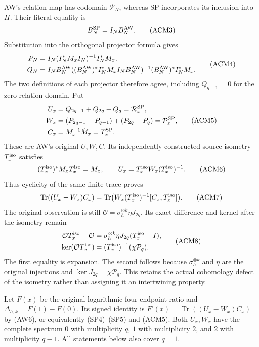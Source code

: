 AW's relation map has codomain $\mathcal P_N$, whereas SP incorporates
its inclusion into $H$. Their literal equality is
\[
 B_N^{\rm SP}=I_NB_N^{\rm AW}.
 \tag{ACM3}
\]
Substitution into the orthogonal projector formula gives
\[
 \begin{aligned}
 P_N&=I_N(I_N^*M_xI_N)^{-1}I_N^*M_x,\\
 Q_N&=I_NB_N^{\rm AW}
       ((B_N^{\rm AW})^*I_N^*M_xI_NB_N^{\rm AW})^{-1}
       (B_N^{\rm AW})^*I_N^*M_x.
 \end{aligned}
 \tag{ACM4}
\]
The two definitions of each projector therefore agree, including
$Q_{q-1}=0$ for the zero relation domain. Put
\[
 \begin{aligned}
 U_x&=Q_{2q-1}+Q_{2q}-Q_q=\mathcal R_x^{\rm SP},\\
 W_x&=(P_{2q-1}-P_{q-1})+(P_{2q}-P_q)=\mathcal P_x^{\rm SP},\\
 C_x&=M_x^{-1}\dot M_x=T_x^{\rm SP}.
 \end{aligned}
 \tag{ACM5}
\]
These are AW's original $U,W,C$. Its independently constructed
source isometry $T^{\rm iso}_x$ satisfies
\[
 (T^{\rm iso}_x)^*M_xT^{\rm iso}_x=M_x,\qquad
 U_x=T^{\rm iso}_xW_x(T^{\rm iso}_x)^{-1}.
 \tag{ACM6}
\]
Thus cyclicity of the same finite trace proves
\[
 \operatorname{Tr}((U_x-W_x)C_x)
 =\operatorname{Tr}\bigl(W_x(T^{\rm iso}_x)^{-1}
                             [C_x,T^{\rm iso}_x]\bigr).
 \tag{ACM7}
\]
The original observation is still
$\mathcal O=\sigma_h^{\otimes k}\eta J_{2q}$. Its exact difference
and kernel after the isometry remain
\[
 \begin{aligned}
 \mathcal OT^{\rm iso}_x-\mathcal O
   &=\sigma_h^{\otimes k}\eta J_{2q}(T^{\rm iso}_x-I),\\
 \ker(\mathcal OT^{\rm iso}_x)
   &=(T^{\rm iso}_x)^{-1}(\chi\mathcal P_q).
 \end{aligned}
 \tag{ACM8}
\]
The first equality is expansion. The second follows because
$\sigma_h^{\otimes k}$ and $\eta$ are the original injections and
$\ker J_{2q}=\chi\mathcal P_q$. This retains the actual cohomology
defect of the isometry rather than assigning it an intertwining property.

Let $F(x)$ be the original logarithmic four-endpoint ratio and
$\Delta_{h,k}=F(1)-F(0)$. Its signed identity is
$F'(x)=\operatorname{Tr}((U_x-W_x)C_x)$ by (AW6), or equivalently
(SP4)--(SP5) and (ACM5). Both $U_x,W_x$ have the complete spectrum
$0$ with multiplicity $q$, $1$ with multiplicity $2$, and $2$ with
multiplicity $q-1$. All statements below also cover $q=1$.

